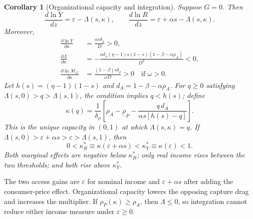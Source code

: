 \documentclass[11pt]{article}
\theoremstyle{plain}
\newtheorem{corollary}{Corollary}
\theoremstyle{definition}
\begin{document}
\begin{corollary}[Organizational capacity and integration]
\label{cor:marginal}
Suppose \(G=0\). Then
\begin{equation}
 \frac{d\ln Y}{dz}=\varepsilon-\Lambda(s,\kappa),\qquad
 \frac{d\ln R}{dz}=\varepsilon+\alpha s-\Lambda(s,\kappa).
 \label{eq:marginal-effects}
\end{equation}
Moreover,
\begin{align}
 \frac{\partial\ln Y}{\partial\kappa}
 &=\frac{\alpha s\delta_\rho}{D}>0, \label{eq:capacity-income}\\
 \frac{\partial\Lambda}{\partial\kappa}
 &=-\frac{\alpha\delta_\rho(\eta-1)s(1-s)
 (1-\beta-\alpha\rho_A)}{D^2}<0, \label{eq:capacity-drag}\\
 \frac{\partial\ln\mathcal M_G}{\partial\kappa}
 &=\frac{(1-\beta)s\delta_\rho}{\omega D}>0
 \quad\text{if }\omega>0. \label{eq:capacity-multiplier}
\end{align}
Let \(h(s)=(\eta-1)(1-s)\) and
\(d_A=1-\beta-\alpha\rho_A\). For \(q\geq0\) satisfying
\(\Lambda(s,0)>q>\Lambda(s,1)\), the condition implies \(q<h(s)\); define
\begin{equation}
 \kappa(q)=\frac{1}{\delta_\rho}
 \left[
 \rho_A-\underline\rho_P-
 \frac{q\,d_A}{\alpha s[h(s)-q]}
 \right].
 \label{eq:capacity-threshold}
\end{equation}
This is the unique capacity in \((0,1)\) at which
\(\Lambda(s,\kappa)=q\). If
\(\Lambda(s,0)>\varepsilon+\alpha s>\varepsilon>\Lambda(s,1)\), then
\[
 0<\kappa_R^*\equiv\kappa(\varepsilon+\alpha s)
 <\kappa_Y^*\equiv\kappa(\varepsilon)<1.
\]
Both marginal effects are negative below \(\kappa_R^*\); only real income
rises between the two thresholds; and both rise above \(\kappa_Y^*\).
\end{corollary}

The two access gains are \(\varepsilon\) for nominal income and
\(\varepsilon+\alpha s\) after adding the consumer-price effect. Organizational
capacity lowers the opposing capture drag and increases the multiplier. If
\(\rho_P(\kappa)\geq\rho_A\), then \(\Lambda\leq0\), so integration cannot
reduce either income measure under \(\varepsilon\geq0\).
\end{document}
